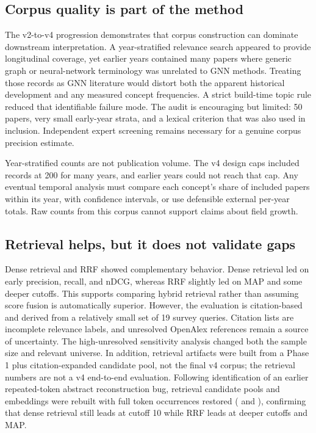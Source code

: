 \documentclass[sigconf,review,anonymous]{acmart}
\begin{document}
\subsection{Corpus quality is part of the method}
The v2-to-v4 progression demonstrates that corpus construction can dominate downstream interpretation. A year-stratified relevance search appeared to provide longitudinal coverage, yet earlier years contained many papers where generic graph or neural-network terminology was unrelated to GNN methods. Treating those records as GNN literature would distort both the apparent historical development and any measured concept frequencies. A strict build-time topic rule reduced that identifiable failure mode. The audit is encouraging but limited: 50 papers, very small early-year strata, and a lexical criterion that was also used in inclusion. Independent expert screening remains necessary for a genuine corpus precision estimate.

Year-stratified counts are not publication volume. The v4 design caps included records at 200 for many years, and earlier years could not reach that cap. Any eventual temporal analysis must compare each concept’s share of included papers within its year, with confidence intervals, or use defensible external per-year totals. Raw counts from this corpus cannot support claims about field growth.

\subsection{Retrieval helps, but it does not validate gaps}
Dense retrieval and RRF showed complementary behavior. Dense retrieval led on early precision, recall, and nDCG, whereas RRF slightly led on MAP and some deeper cutoffs. This supports comparing hybrid retrieval rather than assuming score fusion is automatically superior. However, the evaluation is citation-based and derived from a relatively small set of 19 survey queries. Citation lists are incomplete relevance labels, and unresolved OpenAlex references remain a source of uncertainty. The high-unresolved sensitivity analysis changed both the sample size and relevant universe. In addition, retrieval artifacts were built from a Phase 1 plus citation-expanded candidate pool, not the final v4 corpus; the retrieval numbers are not a v4 end-to-end evaluation. Following identification of an earlier repeated-token abstract reconstruction bug, retrieval candidate pools and embeddings were rebuilt with full token occurrences restored (\texttt{} and \texttt{}), confirming that dense retrieval still leads at cutoff 10 while RRF leads at deeper cutoffs and MAP.
\end{document}
